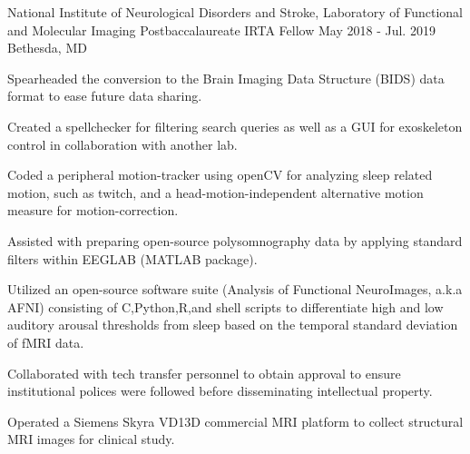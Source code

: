 \begin{cventries}
{ 	}
 \cventry
 {National Institute of Neurological Disorders and Stroke, Laboratory of Functional and Molecular Imaging}
 {Postbaccalaureate IRTA Fellow}
 {May 2018 - Jul. 2019}
 {Bethesda, MD}
 	{
		\begin{cvitems}
		    \item {Spearheaded the conversion to the Brain Imaging Data Structure (BIDS) data format to ease future data sharing.}
        	\item {Created a spellchecker for filtering search queries as well as a GUI for exoskeleton control in collaboration with another lab.}
        	\item {Coded a peripheral motion-tracker using openCV for analyzing sleep related motion, such as twitch, and a head-motion-independent alternative motion measure for motion-correction.}
        	\item {Assisted with preparing open-source polysomnography data by applying standard filters within EEGLAB (MATLAB package).}
        	\item {Utilized an open-source software suite (Analysis of Functional NeuroImages, a.k.a AFNI) consisting of C,Python,R,and shell scripts to differentiate high and low auditory arousal thresholds from sleep based on the temporal standard deviation of fMRI data.}
        	\item {Collaborated with tech transfer personnel to obtain approval to ensure institutional polices were followed before disseminating intellectual property.}
        	\item {Operated a Siemens Skyra VD13D commercial MRI platform to collect structural MRI images for clinical study.}
        \end{cvitems}
 	}
 

\end{cventries}
